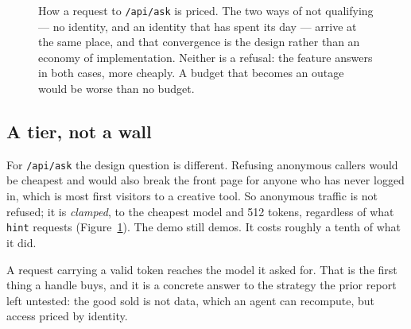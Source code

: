 \documentclass[10pt,letterpaper,twocolumn]{article}
\newcommand{\code}[1]{\texttt{#1}}
\begin{document}
\begin{figure}[t]
\centering
\footnotesize
{}
\caption{How a request to \code{/api/ask} is priced. The two ways of not
qualifying --- no identity, and an identity that has spent its day --- arrive at
the same place, and that convergence is the design rather than an economy of
implementation. Neither is a refusal: the feature answers in both cases, more
cheaply. A budget that becomes an outage would be worse than no budget.}
\label{fig:tier}
\end{figure}

\subsection{A tier, not a wall}

For \code{/api/ask} the design question is different. Refusing anonymous callers
would be cheapest and would also break the front page for anyone who has never
logged in, which is most first visitors to a creative tool. So anonymous traffic
is not refused; it is \emph{clamped}, to the cheapest model and 512 tokens,
regardless of what \code{hint} requests (Figure~\ref{fig:tier}). The demo still demos. It costs roughly a
tenth of what it did.

A request carrying a valid token reaches the model it asked for. That is the
first thing a handle buys, and it is a concrete answer to the strategy the prior
report left untested: the good sold is not data, which an agent can recompute,
but access priced by identity.
\end{document}
